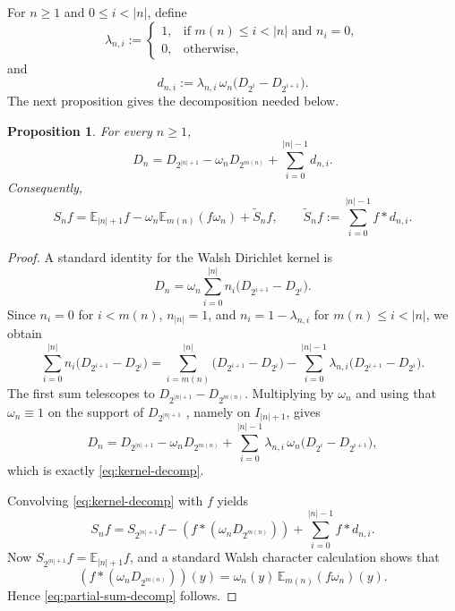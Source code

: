 \documentclass[11pt]{amsart}
\numberwithin{equation}{section}
\newtheorem{proposition}[theorem]{Proposition}
\theoremstyle{remark}
\begin{document}
For $n\ge1$ and $0\le i<|n|$, define 
\begin{equation}
\lambda_{n,i}:= 
\begin{cases}
1, & \text{if }m(n)\le i<|n|\text{ and }n_i=0, \\ 
0, & \text{otherwise,}%
\end{cases}
\label{eq:lambda-def}
\end{equation}
and 
\begin{equation}
d_{n,i}:=\lambda_{n,i}\,\omega_n\bigl(D_{2^i}-D_{2^{i+1}}\bigr).
\label{eq:dni-def}
\end{equation}
The next proposition gives the decomposition needed below.

\begin{proposition}
\label{prop:kernel-decomp} For every $n\ge1$, 
\begin{equation}
D_n = D_{2^{|n|+1}}-\omega_n D_{2^{m(n)}}+\sum_{i=0}^{|n|-1}d_{n,i}.
\label{eq:kernel-decomp}
\end{equation}
Consequently, 
\begin{equation}
S_n f =\mathbb{E}_{|n|+1}f-\omega_n\mathbb{E}_{m(n)}(f\omega_n)+\widetilde
S_n f, \qquad \widetilde S_n f:=\sum_{i=0}^{|n|-1} f*d_{n,i}.
\label{eq:partial-sum-decomp}
\end{equation}
\end{proposition}

\begin{proof}
A standard identity for the Walsh Dirichlet kernel is 
\begin{equation}
D_n=\omega_n\sum_{i=0}^{|n|}n_i\bigl(D_{2^{i+1}}-D_{2^i}\bigr).
\label{eq:dir-standard}
\end{equation}
Since $n_i=0$ for $i<m(n)$, $n_{|n|}=1$, and $n_i=1-\lambda_{n,i}$ for $%
m(n)\le i<|n|$, we obtain 
\begin{equation*}
\sum_{i=0}^{|n|}n_i\bigl(D_{2^{i+1}}-D_{2^i}\bigr)
= \sum_{i=m(n)}^{|n|}\bigl(D_{2^{i+1}}-D_{2^i}\bigr)
- \sum_{i=0}^{|n|-1}\lambda_{n,i}\bigl(D_{2^{i+1}}-D_{2^i}\bigr). 
\end{equation*}
The first sum telescopes to $D_{2^{|n|+1}}-D_{2^{m(n)}}$. Multiplying by $%
\omega_n$ and using that $\omega_n\equiv1$ on the support of $D_{2^{|n|+1}}$%
, namely on $I_{|n|+1}$, gives 
\begin{equation*}
D_n = D_{2^{|n|+1}}-\omega_n D_{2^{m(n)}}
+\sum_{i=0}^{|n|-1}\lambda_{n,i}\,\omega_n\bigl(D_{2^i}-D_{2^{i+1}}\bigr), 
\end{equation*}
which is exactly \eqref{eq:kernel-decomp}.

Convolving \eqref{eq:kernel-decomp} with $f$ yields 
\begin{equation*}
S_n f= S_{2^{|n|+1}}f-(f*(\omega_nD_{2^{m(n)}}))+
\sum_{i=0}^{|n|-1}f*d_{n,i}. 
\end{equation*}
Now $S_{2^{|n|+1}}f=\mathbb{E}_{|n|+1}f$, and a standard Walsh character calculation shows that 
\begin{equation*}
(f*(\omega_nD_{2^{m(n)}}))(y)=\omega_n(y)\,\mathbb{E}_{m(n)}(f\omega_n)(y). 
\end{equation*}
Hence \eqref{eq:partial-sum-decomp} follows.
\end{proof}
\end{document}
